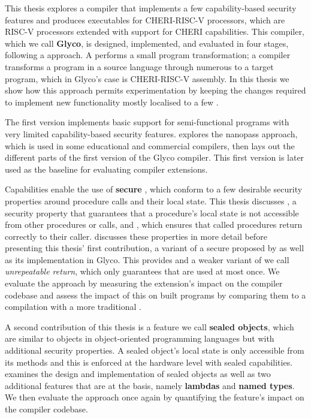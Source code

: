 \documentclass[main.tex]{subfiles}
\begin{document}
This thesis explores a compiler that implements a few capability-based security features and produces executables for CHERI-RISC-V processors, which are RISC-V processors extended with support for CHERI capabilities. This compiler, which we call \textbf{Glyco}, is designed, implemented, and evaluated in four stages, following a  approach. A  performs a small program transformation; a  compiler transforms a program in a source language through numerous  to a target program, which in Glyco's case is CHERI-RISC-V assembly. In this thesis we show how this approach permits experimentation by keeping the changes required to implement new functionality mostly localised to a few .

The first version implements basic support for semi-functional programs with very limited capability-based security features.  explores the nanopass approach, which is used in some educational and commercial compilers, then lays out the different parts of the first version of the Glyco compiler. This first version is later used as the baseline for evaluating compiler extensions.

Capabilities enable the use of \textbf{secure }, which conform to a few desirable security properties around procedure calls and their local state. This thesis discusses \emph{}, a security property that guarantees that a procedure's local state is not accessible from other procedures or calls, and \emph{}, which ensures that called procedures return correctly to their caller.  discusses these properties in more detail before presenting this thesis' first contribution, a variant of a secure  proposed by \citet{cerise} as well as its implementation in Glyco. This  provides  and a weaker variant of  we call \emph{unrepeatable return}, which only guarantees that  are used at most once. We evaluate the  approach by measuring the extension's impact on the compiler codebase and assess the impact of this  on built programs by comparing them to a compilation with a more traditional .

A second contribution of this thesis is a feature we call \textbf{sealed objects}, which are similar to objects in object-oriented programming languages but with additional security properties. A sealed object's local state is only accessible from its methods and this is enforced at the hardware level with sealed capabilities.  examines the design and implementation of sealed objects as well as two additional features that are at the basis, namely \textbf{lambdas} and \textbf{named types}. We then evaluate the  approach once again by quantifying the feature's impact on the compiler codebase.
\end{document}
